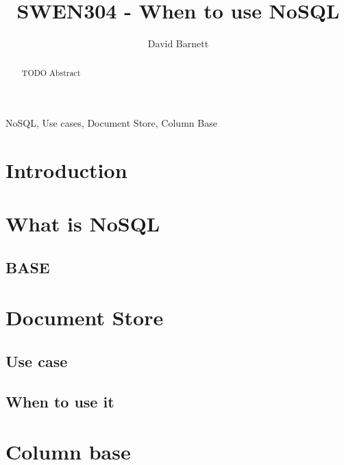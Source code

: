 \documentclass{CRPITStyle}
\renewcommand{\cite}{\citep}
\begin{document}
\title{SWEN304 - When to use NoSQL}
\author{David Barnett}

\maketitle

\begin{abstract}
    TODO Abstract
\end{abstract}

\vspace{.1in}

 NoSQL, Use cases, Document Store, Column Base

\section{Introduction}

\cite{whats_new}
\cite{sql_nosql_gap}
\cite{scalable_sql}

\section{What is NoSQL}

\subsection{BASE}

\section{Document Store}

\subsection{Use case}
\subsection{When to use it}

\section{Column base}
\end{document}

